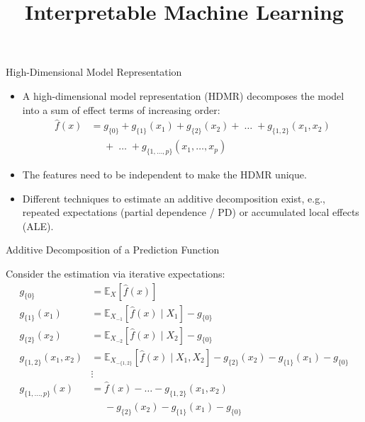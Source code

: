 \documentclass[11pt,compress,t,notes=noshow, xcolor=table]{beamer}
\title{Interpretable Machine Learning}
\institute{\href{https://compstat-lmu.github.io/lecture_iml/}{compstat-lmu.github.io/lecture\_iml}}
\date{}
\begin{document}



% 
\begin{vbframe}{High-Dimensional Model Representation}

\begin{itemize}
\item
A high-dimensional model representation (HDMR) decomposes the model into a sum of effect terms of increasing order:
\begin{align*}
\hat{f}(x) &= g_{\{0\}} + g_{\{1\}}(x_1) + g_{\{2\}}(x_2) + \;\dots\; + g_{\{1, 2\}}(x_1, x_2) \\
&\phantom{{}={}} + \;\dots\; + g_{\{1,\ldots,p\}}(x_1, \ldots,x_p)
\end{align*}
\item The features need to be independent to make the HDMR unique.
\item Different techniques to estimate an additive decomposition exist, e.g., repeated expectations (partial dependence / PD) or accumulated local effects (ALE).

\end{itemize}
\end{vbframe}

\begin{vbframe}{Additive Decomposition of a Prediction Function}

Consider the estimation via iterative expectations:
\begin{align*}
 g_{\{0\}} &= \mathbb{E}_X\left[\widehat{f}(x)\right] \\
 g_{\{1\}}(x_1) &= \mathbb{E}_{X_{-1}}\left[\widehat{f}(x) \; \vert  \; X_1 \right] - g_{\{0\}} \\
 g_{\{2\}}(x_2) &= \mathbb{E}_{X_{-2}}\left[\widehat{f}(x) \; \vert  \; X_2 \right] - g_{\{0\}} \\
 g_{\{1, 2\}}(x_1, x_2) &= \mathbb{E}_{X_{-\{1,2\}}}\left[\widehat{f}(x) \; \vert \; X_1, X_2 \right] - g_{\{2\}}(x_2) - g_{\{1\}}(x_1) - g_{\{0\}}\\
 &\vdots \\
 g_{\{1, \dots, p\}}(x) &= \widehat{f}(x) - \dots - g_{\{1, 2\}}(x_1, x_2) \\
 &\phantom{{}={}} - g_{\{2\}}(x_2) - g_{\{1\}}(x_1) - g_{\{0\}}\\
\end{align*}

\end{vbframe}
\end{document}
